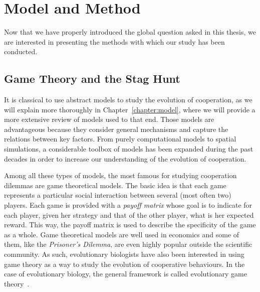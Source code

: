 



\section{Model and Method}

  Now that we have properly introduced the global question asked in this thesis, we are interested in presenting the methods with which our study has been conducted.
  
  \subsection{Game Theory and the Stag Hunt}

    It is classical to use abstract models to study the evolution of cooperation, as we will explain more thoroughly in Chapter~\ref{chapter:model}, where we will provide a more extensive review of models used to that end. Those models are advantageous because they consider general mechanisms and capture the relations between key factors. From purely computational models to spatial simulations, a considerable toolbox of models has been expanded during the past decades in order to increase our understanding of the evolution of cooperation.

    Among all these types of models, the most famous for studying cooperation dilemmas are game theoretical models. The basic idea is that each game represents a particular social interaction between several (most often two) players. Each game is provided with a \emph{payoff matrix} whose goal is to indicate for each player, given her strategy and that of the other player, what is her expected reward. This way, the payoff matrix is used to describe the specificity of the game as a whole. Game theoretical models are well used in economics and some of them, like the \emph{Prisoner's Dilemma}, are even highly popular outside the scientific community. As such, evolutionary biologists have also been interested in using game theory as a way to study the evolution of cooperative behaviours. In the case of evolutionary biology, the general framework is called evolutionary game theory~\parencite{MaynardSmith1973}.

